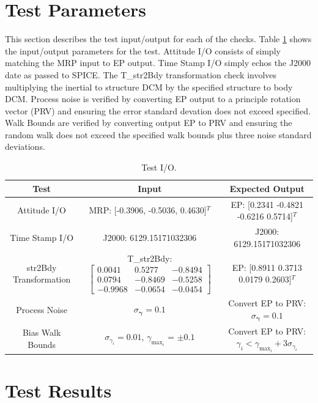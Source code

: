 \documentclass[]{BasiliskReportMemo}
\begin{document}
\section{Test Parameters}

This section describes the test input/output for each of the checks. Table \ref{tab:parameters} shows the input/output parameters for the test. Attitude I/O consists of simply matching the MRP input to EP output. Time Stamp I/O simply echos the J2000 date as passed to SPICE. The T\_str2Bdy transformation check involves multiplying the inertial to structure DCM by the specified structure to body DCM. Process noise is verified by converting EP output to a principle rotation vector (PRV) and ensuring the error standard devation does not exceed specified. Walk Bounds are verified by converting output EP to PRV and ensuring the random walk does not exceed the specified walk bounds plus three noise standard deviations.

\begin{table}[htbp]
	\caption{Test I/O.}
	\label{tab:parameters}
	\centering \fontsize{10}{10}\selectfont
	\begin{tabular}{ c | c | c }
		\hline
		Test   & Input & Expected Output \\ \hline
		Attitude I/O & MRP: [-0.3906, -0.5036, 0.4630]$^T$ & EP: [0.2341   -0.4821   -0.6216    0.5714]$^T$ \\ \hline
		Time Stamp I/O & J2000: 6129.15171032306 & J2000: 6129.15171032306 \\ \hline
		str2Bdy Transformation & T\_str2Bdy: $\begin{bmatrix}0.0041 & 0.5277 & -0.8494 \\ 0.0794 & -0.8469 & -0.5258 \\ -0.9968 & -0.0654 & -0.0454 \end{bmatrix}$ & EP: [0.8911    0.3713    0.0179    0.2603]$^T$ \\ \hline
		Process Noise & $\sigma_{\bm{\gamma}} = 0.1$ & Convert EP to PRV: $\sigma_{\bm{\gamma}} = 0.1$\\ \hline
		Bias Walk Bounds & $\sigma_{\gamma_i} = 0.01$, $\gamma_{\text{max}_i}$ = $\pm 0.1$ & Convert EP to PRV: $\gamma_i < \gamma_{\text{max}_i} + 3 \sigma_{\gamma_i}$ \\ \hline
	\end{tabular}
\end{table}


\section{Test Results}
\end{document}
